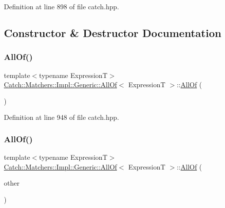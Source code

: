 Definition at line 898 of file catch.\+hpp.



\subsection{Constructor \& Destructor Documentation}
\hypertarget{class_catch_1_1_matchers_1_1_impl_1_1_generic_1_1_all_of_a9dfcc2f0549114f3b50cc65a2e10c996}{}\label{class_catch_1_1_matchers_1_1_impl_1_1_generic_1_1_all_of_a9dfcc2f0549114f3b50cc65a2e10c996} 
\subsubsection{\texorpdfstring{All\+Of()}{AllOf()}\hspace{0.1cm}{\footnotesize\ttfamily [1/2]}}
{\footnotesize\ttfamily template$<$typename ExpressionT$>$ \\
\hyperlink{class_catch_1_1_matchers_1_1_impl_1_1_generic_1_1_all_of}{Catch\+::\+Matchers\+::\+Impl\+::\+Generic\+::\+All\+Of}$<$ ExpressionT $>$\+::\hyperlink{class_catch_1_1_matchers_1_1_impl_1_1_generic_1_1_all_of}{All\+Of} (\begin{DoxyParamCaption}{ }\end{DoxyParamCaption})\hspace{0.3cm}{\ttfamily [inline]}}



Definition at line 948 of file catch.\+hpp.

\hypertarget{class_catch_1_1_matchers_1_1_impl_1_1_generic_1_1_all_of_a31f7c5e570e79bdf64064ee87c331a59}{}\label{class_catch_1_1_matchers_1_1_impl_1_1_generic_1_1_all_of_a31f7c5e570e79bdf64064ee87c331a59} 
\subsubsection{\texorpdfstring{All\+Of()}{AllOf()}\hspace{0.1cm}{\footnotesize\ttfamily [2/2]}}
{\footnotesize\ttfamily template$<$typename ExpressionT$>$ \\
\hyperlink{class_catch_1_1_matchers_1_1_impl_1_1_generic_1_1_all_of}{Catch\+::\+Matchers\+::\+Impl\+::\+Generic\+::\+All\+Of}$<$ ExpressionT $>$\+::\hyperlink{class_catch_1_1_matchers_1_1_impl_1_1_generic_1_1_all_of}{All\+Of} (\begin{DoxyParamCaption}\item[{\hyperlink{class_catch_1_1_matchers_1_1_impl_1_1_generic_1_1_all_of}{All\+Of}$<$ ExpressionT $>$ const \&}]{other }\end{DoxyParamCaption})\hspace{0.3cm}{\ttfamily [inline]}}



